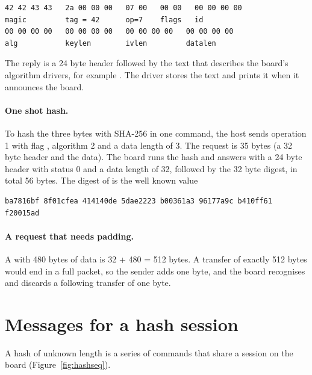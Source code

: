 \begin{lstlisting}[style=shell]
42 42 43 43   2a 00 00 00   07 00   00 00   00 00 00 00
magic         tag = 42      op=7    flags   id
00 00 00 00   00 00 00 00   00 00 00 00   00 00 00 00
alg           keylen        ivlen         datalen
\end{lstlisting}

The reply is a 24 byte header followed by the text that describes the board's algorithm drivers, for example . The driver stores the text and prints it when it announces the board.

\paragraph{One shot hash.} To hash the three bytes  with SHA-256 in one command, the host sends operation 1 with flag , algorithm 2 and a data length of 3. The request is 35 bytes (a 32 byte header and the data). The board runs the hash and answers with a 24 byte header with status 0 and a data length of 32, followed by the 32 byte digest, in total 56 bytes. The digest of  is the well known value

\begin{lstlisting}[style=shell]
ba7816bf 8f01cfea 414140de 5dae2223 b00361a3 96177a9c b410ff61 f20015ad
\end{lstlisting}

\paragraph{A request that needs padding.} A  with 480 bytes of data is 32 + 480 = 512 bytes. A transfer of exactly 512 bytes would end in a full packet, so the sender adds one byte, and the board recognises and discards a following transfer of one byte.

\section{Messages for a hash session}

A hash of unknown length is a series of commands that share a session on the board (Figure~\ref{fig:hashseq}).

